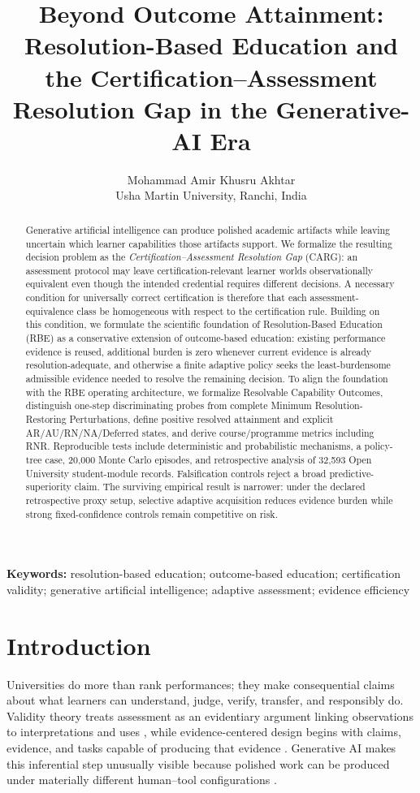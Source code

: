 \documentclass[11pt]{article}
\title{\textbf{Beyond Outcome Attainment: Resolution-Based Education and the Certification--Assessment Resolution Gap in the Generative-AI Era}}
\author{Mohammad Amir Khusru Akhtar\\Usha Martin University, Ranchi, India}
\date{}
\begin{document}
\maketitle
\begin{abstract}
Generative artificial intelligence can produce polished academic artifacts while leaving uncertain which learner capabilities those artifacts support. We formalize the resulting decision problem as the \emph{Certification--Assessment Resolution Gap} (CARG): an assessment protocol may leave certification-relevant learner worlds observationally equivalent even though the intended credential requires different decisions. A necessary condition for universally correct certification is therefore that each assessment-equivalence class be homogeneous with respect to the certification rule. Building on this condition, we formulate the scientific foundation of Resolution-Based Education (RBE) as a conservative extension of outcome-based education: existing performance evidence is reused, additional burden is zero whenever current evidence is already resolution-adequate, and otherwise a finite adaptive policy seeks the least-burdensome admissible evidence needed to resolve the remaining decision. To align the foundation with the RBE operating architecture, we formalize Resolvable Capability Outcomes, distinguish one-step discriminating probes from complete Minimum Resolution-Restoring Perturbations, define positive resolved attainment and explicit AR/AU/RN/NA/Deferred states, and derive course/programme metrics including RNR. Reproducible tests include deterministic and probabilistic mechanisms, a policy-tree case, 20,000 Monte Carlo episodes, and retrospective analysis of 32,593 Open University student-module records. Falsification controls reject a broad predictive-superiority claim. The surviving empirical result is narrower: under the declared retrospective proxy setup, selective adaptive acquisition reduces evidence burden while strong fixed-confidence controls remain competitive on risk.
\end{abstract}
\noindent\textbf{Keywords:} resolution-based education; outcome-based education; certification validity; generative artificial intelligence; adaptive assessment; evidence efficiency

\section{Introduction}
Universities do more than rank performances; they make consequential claims about what learners can understand, judge, verify, transfer, and responsibly do. Validity theory treats assessment as an evidentiary argument linking observations to interpretations and uses \parencite{messick1995validity}, while evidence-centered design begins with claims, evidence, and tasks capable of producing that evidence \parencite{mislevy2003ecd}. Generative AI makes this inferential step unusually visible because polished work can be produced under materially different human--tool configurations \parencite{bearman2024evaluative,luo2024policies,xia2024scoping,khlaif2025redesign}.
\end{document}
